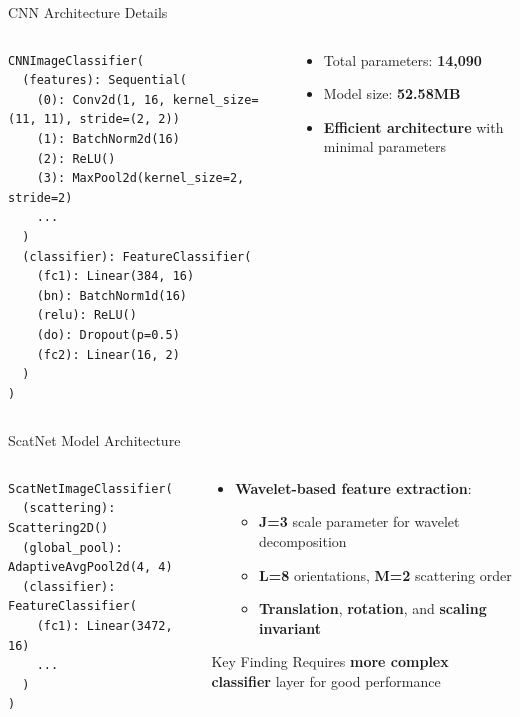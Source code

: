 \documentclass[aspectratio=169,8pt]{beamer}  %
\begin{document}
\begin{frame}[fragile]{CNN Architecture Details}
\begin{columns}[T]
\begin{column}{0.6\textwidth}
\begin{verbatim}
CNNImageClassifier(
  (features): Sequential(
    (0): Conv2d(1, 16, kernel_size=(11, 11), stride=(2, 2))
    (1): BatchNorm2d(16)
    (2): ReLU()
    (3): MaxPool2d(kernel_size=2, stride=2)
    ...
  )
  (classifier): FeatureClassifier(
    (fc1): Linear(384, 16)
    (bn): BatchNorm1d(16)
    (relu): ReLU()
    (do): Dropout(p=0.5)
    (fc2): Linear(16, 2)
  )
)
\end{verbatim}
\end{column}
\begin{column}{0.4\textwidth}
\begin{itemize}
\item Total parameters: \textbf{14,090}
\item Model size: \textbf{52.58MB}
\item \textbf{Efficient architecture} with minimal parameters
\end{itemize}
\end{column}
\end{columns}
\end{frame}

\begin{frame}[fragile]{ScatNet Model Architecture}
\begin{columns}[T]
\begin{column}{0.6\textwidth}
\begin{verbatim}
ScatNetImageClassifier(
  (scattering): Scattering2D()
  (global_pool): AdaptiveAvgPool2d(4, 4)
  (classifier): FeatureClassifier(
    (fc1): Linear(3472, 16)
    ...
  )
)
\end{verbatim}
\end{column}
\begin{column}{0.4\textwidth}
\begin{itemize}
\item \textbf{Wavelet-based feature extraction}:
  \begin{itemize}
  \item \textbf{J=3} scale parameter for wavelet decomposition
  \item \textbf{L=8} orientations, \textbf{M=2} scattering order
  \item \textbf{Translation}, \textbf{rotation}, and \textbf{scaling invariant}
  \end{itemize}
\end{itemize}

\begin{alertblock}{Key Finding}
Requires \textbf{more complex classifier} layer for good performance
\end{alertblock}
\end{column}
\end{columns}
\end{frame}
\end{document}
